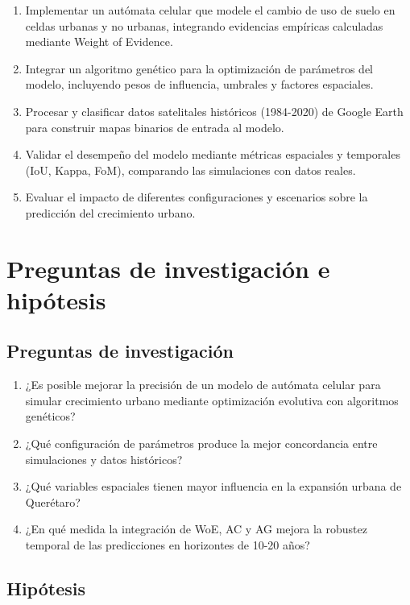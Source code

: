 \begin{enumerate}
	\item Implementar un autómata celular que modele el cambio de uso de suelo en celdas urbanas y no urbanas, integrando evidencias empíricas calculadas mediante Weight of Evidence.
	\item Integrar un algoritmo genético para la optimización de parámetros del modelo, incluyendo pesos de influencia, umbrales y factores espaciales.
	\item Procesar y clasificar datos satelitales históricos (1984-2020) de Google Earth para construir mapas binarios de entrada al modelo.
	\item Validar el desempeño del modelo mediante métricas espaciales y temporales (IoU, Kappa, FoM), comparando las simulaciones con datos reales.
	\item Evaluar el impacto de diferentes configuraciones y escenarios sobre la predicción del crecimiento urbano.
\end{enumerate}

\section{Preguntas de investigación e hipótesis}

\subsection{Preguntas de investigación}

\begin{enumerate}
	\item ¿Es posible mejorar la precisión de un modelo de autómata celular para simular crecimiento urbano mediante optimización evolutiva con algoritmos genéticos?
	\item ¿Qué configuración de parámetros produce la mejor concordancia entre simulaciones y datos históricos?
	\item ¿Qué variables espaciales tienen mayor influencia en la expansión urbana de Querétaro?
	\item ¿En qué medida la integración de WoE, AC y AG mejora la robustez temporal de las predicciones en horizontes de 10-20 años?
\end{enumerate}

\subsection{Hipótesis}

